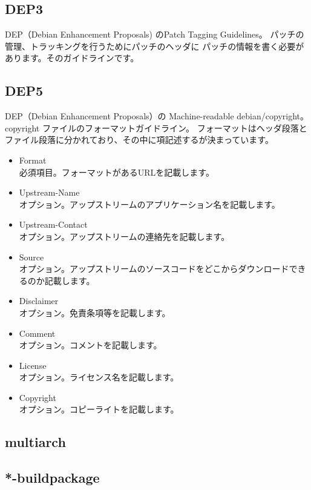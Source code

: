 \documentclass[mingoth,a4paper]{jsarticle}
\begin{document}
\subsection{DEP3}
DEP（Debian Enhancement Proposals) のPatch Tagging Guidelines。
パッチの管理、トラッキングを行うためにパッチのヘッダに
パッチの情報を書く必要があります。そのガイドラインです。

\subsection{DEP5}
DEP（Debian Enhancement Proposals）の Machine-readable debian/copyright。
copyright ファイルのフォーマットガイドライン。
フォーマットはヘッダ段落とファイル段落に分かれており、その中に項記述するが決まっています。

\begin{itemize}
\item Format\\
必須項目。フォーマットがあるURLを記載します。
\item Upstream-Name\\
オプション。アップストリームのアプリケーション名を記載します。
\item Upstream-Contact\\
オプション。アップストリームの連絡先を記載します。
\item Source\\
オプション。アップストリームのソースコードをどこからダウンロードできるのか記載します。
\item Disclaimer\\
オプション。免責条項等を記載します。
\item Comment\\
オプション。コメントを記載します。
\item License\\
オプション。ライセンス名を記載します。
\item Copyright\\
オプション。コピーライトを記載します。
\end{itemize}


\subsection{multiarch}
\subsection{*-buildpackage}
\end{document}
